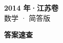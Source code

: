 \documentclass[zihao=-4, a4paper]{ctexart}
\begin{document}
\begin{center}
  {\Large\bfseries 2014 年·江苏卷}\\[4pt]
  {\large 数学 · 简答版}
\end{center}
\medskip
{}

\clearpage
{}
\begin{center}{\Large\bfseries 答案速查}\end{center}
\medskip

\end{document}
